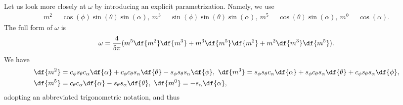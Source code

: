 Let us look more closely at $\omega$ by introducing an explicit parametrization. Namely, we use
\begin{align*}
	m^{2} = \cos(\phi)\sin(\theta)\sin(\alpha),\ m^{3} = \sin(\phi)\sin(\theta)\sin(\alpha),\ m^{5} = \cos(\theta)\sin(\alpha),\ m^{0} = \cos(\alpha).
\end{align*}
The full form of $\omega$ is
\begin{align*}
	\omega = \frac{4}{5\pi}(m^{5}\df{m^{2}}\df{m^{3}} + m^{3}\df{m^{5}}\df{m^{2}} + m^{2}\df{m^{3}}\df{m^{5}}).
\end{align*}
We have
\begin{align*}
	&\df{m^{2}} = c_{\phi}s_{\theta}c_{\alpha}\df{\alpha} + c_{\phi}c_{\theta}s_{\alpha}\df{\theta} - s_{\phi}s_{\theta}s_{\alpha}\df{\phi},\ \df{m^{3}} = s_{\phi}s_{\theta}c_{\alpha}\df{\alpha} + s_{\phi}c_{\theta}s_{\alpha}\df{\theta} + c_{\phi}s_{\theta}s_{\alpha}\df{\phi}, \\
	&\df{m^{5}} = c_{\theta}c_{\alpha}\df{\alpha} - s_{\theta}s_{\alpha}\df{\theta},\ \df{m^{0}} = -s_{\alpha}\df{\alpha},
\end{align*}
adopting an abbreviated trigonometric notation, and thus
